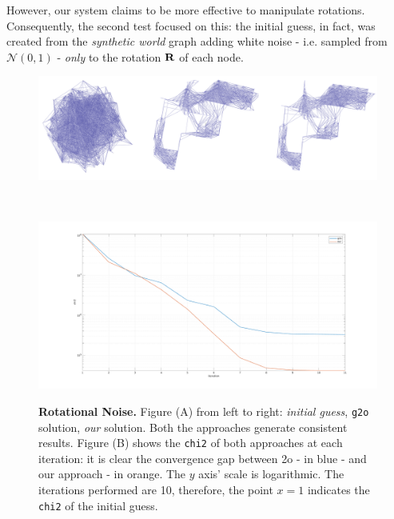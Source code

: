 However, our system claims to be more effective to manipulate rotations. Consequently, the second test focused on this: the initial guess, in fact, was created from the \textit{synthetic world} graph adding white noise - i.e. sampled from $\mathcal{N}(0,1)$ - \textit{only} to the rotation $\mathbf{R}$ of each node.

\begin{figure}[!hbt]
    \centering    
    \begin{minipage}[t!]{0.9\textwidth}
        \centering
        \includegraphics[width=\textwidth]{figures/04_solvingSe3/viewer_500p_awgn_SOLVED.png}
        \subcaption{} 
        \label{fig:500p_awgn_solution}
    \end{minipage}\\
    \begin{minipage}[t!]{0.9\textwidth}
        \centering
        \includegraphics[width=\textwidth]{figures/04_solvingSe3/500p_N0_1.pdf}
        \subcaption{}
        \label{fig:500p_awgn_chi2}
    \end{minipage}%
    \caption{\textbf{Rotational Noise.} Figure (A) from left to right: \textit{initial guess}, \texttt{g2o} solution, \textit{our} solution. Both the approaches generate consistent results. Figure (B) shows the \texttt{chi2} of both approaches at each iteration: it is clear the convergence gap between \g2o - in blue - and our approach - in orange. The $y$ axis' scale is logarithmic. The iterations performed are 10, therefore, the point $x = 1$ indicates the \texttt{chi2} of the initial guess.}
    \label{fig:500p_awgn}
\end{figure}

